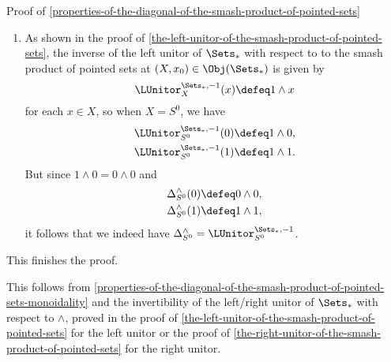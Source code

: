 \begin{Proof}{Proof of \cref{properties-of-the-diagonal-of-the-smash-product-of-pointed-sets}}
\begin{enumerate}
\[\begin{tikzcd}[row sep={5.0*\the\DL,between origins}, column sep={9.0*\the\DL,between origins}, background color=backgroundColor, ampersand replacement=\&]
                    \&
                    (x\wedge y)\wedge(x\wedge y)
                \end{tikzcd}
            \]%
            and hence indeed commutes.
        \item{}As shown in the proof of \cref{the-left-unitor-of-the-smash-product-of-pointed-sets}, the inverse of the left unitor of $\Sets_{*}$ with respect to to the smash product of pointed sets at $(X,x_{0})\in\Obj(\Sets_{*})$ is given by
            \[
                \LUnitor^{\Sets_{*},-1}_{X}(x)%
                \defeq%
                1\wedge x
            \]%
            for each $x\in X$, so when $X=S^{0}$, we have
            \begin{align*}
                \LUnitor^{\Sets_{*},-1}_{S^{0}}(0) &\defeq 1\wedge0,\\
                \LUnitor^{\Sets_{*},-1}_{S^{0}}(1) &\defeq 1\wedge1.
            \end{align*}
            But since $1\wedge0=0\wedge0$ and
            \begin{align*}
                \Delta^{\wedge}_{S^{0}}(0) &\defeq 0\wedge0,\\
                \Delta^{\wedge}_{S^{0}}(1) &\defeq 1\wedge1,
            \end{align*}
            it follows that we indeed have $\Delta^{\wedge}_{S^{0}}=\LUnitor^{\Sets_{*},-1}_{S^{0}}$.
    \end{enumerate}
    This finishes the proof.

    This follows from \cref{properties-of-the-diagonal-of-the-smash-product-of-pointed-sets-monoidality} and the invertibility of the left/right unitor of $\Sets_{*}$ with respect to $\wedge$, proved in the proof of \cref{the-left-unitor-of-the-smash-product-of-pointed-sets} for the left unitor or the proof of \cref{the-right-unitor-of-the-smash-product-of-pointed-sets} for the right unitor.
\end{Proof}
